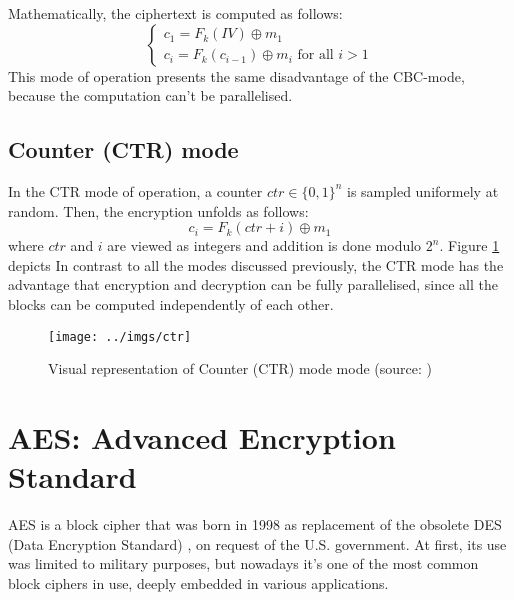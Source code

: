 \documentclass[12pt,a4paper]{book}
\theoremstyle{definition}
\begin{document}
 	Mathematically, the ciphertext is computed as follows:
 	\[
 	\begin{cases}
 		c_1 = F_k(IV) \oplus m_1\\
 		c_i = F_k(c_{i-1}) \oplus m_i \text{ for all } i>1
 	\end{cases}
 	\]
 	This mode of operation presents the same disadvantage of the CBC-mode, because the computation can't be parallelised.
	\subsection{Counter (CTR) mode}
	In the CTR mode of operation, a counter $ctr \in \{0,1\}^n$ is sampled uniformely at random. Then, the encryption unfolds as follows:
	\[
		c_i = F_k(ctr + i) \oplus m_1
	\]
	where $ctr$ and $i$ are viewed as integers and addition is done modulo $2^n$. Figure \ref{fig:ctr} depicts In contrast to all the modes discussed previously, the CTR mode has the advantage that encryption and decryption can be fully parallelised, since all the blocks can be computed independently of each other.
	\begin{figure}[!ht]
		\centering
		\texttt{[image: ../imgs/ctr]}
		\captionsetup{width=.55\linewidth}
		\caption{Visual representation of Counter (CTR) mode mode (source: \cite{Katz2007})}
		\label{fig:ctr}
	\end{figure}
	
	\section{AES: Advanced Encryption Standard}\label{sec:aes}
	AES \cite{Katz2007} \cite{AES-FIPS} is a block cipher that was born in 1998 as replacement of the obsolete DES (Data Encryption Standard) \cite{DES1999}, on request of the U.S. government. At first, its use was limited to military purposes, but nowadays it’s one of the most common block ciphers in use, deeply embedded in various applications. 
	
\end{document}
